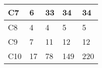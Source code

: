\begin{table}[tbp]
{\begin{tabular}{p{1.4cm}p{2.4cm}p{2.4cm}p{2.4cm}p{2.4cm}}
\hline
\vspace{0.5pt} C7 & \vspace{0.5pt} 6 & \vspace{0.5pt} 33 & \vspace{0.5pt} 34 & \vspace{0.5pt} 34 \\
\hline
\vspace{0.5pt} C8 & \vspace{0.5pt} 4 & \vspace{0.5pt} 4 & \vspace{0.5pt} 5 & \vspace{0.5pt} 5 \\
\hline
\vspace{0.5pt} C9 & \vspace{0.5pt} 7 & \vspace{0.5pt} 11 & \vspace{0.5pt} 12 & \vspace{0.5pt} 12 \\
\hline
\vspace{0.5pt} C10 & \vspace{0.5pt} 17 & \vspace{0.5pt} 78 & \vspace{0.5pt} 149 & \vspace{0.5pt} 220 \\
\hline
\end{tabular}}
\end{table}

